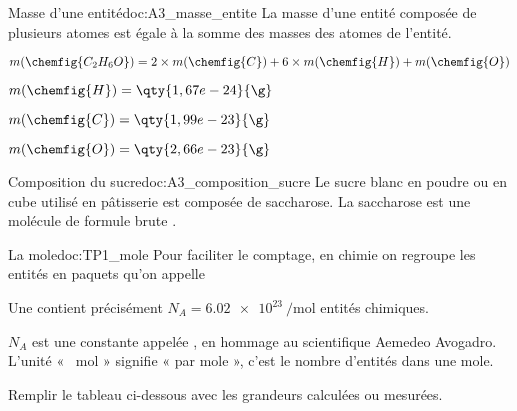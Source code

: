 \begin{doc}{Masse d'une entité}{doc:A3_masse_entite}
  La masse d'une entité composée de plusieurs atomes est égale à la somme des masses des atomes de l'entité.
  
  \exemple 
  $m(\chemfig{C_2 H_6 O}) = 2\times m(\chemfig{C}) + 6\times m(\chemfig{H}) + m(\chemfig{O})$
  
  \begin{donnees}
    \item $m(\chemfig{H})  = \qty{1,67e-24}{\g}$
    \item $m(\chemfig{C})  = \qty{1,99e-23}{\g}$
    \item $m(\chemfig{O})  = \qty{2,66e-23}{\g}$
  \end{donnees}
\end{doc}

\begin{doc}{Composition du sucre}{doc:A3_composition_sucre}
  Le sucre blanc en poudre ou en cube utilisé en pâtisserie est composée de saccharose.
  La saccharose est une molécule de formule brute .
\end{doc}




\begin{doc}{La mole}{doc:TP1_mole}
  Pour faciliter le comptage, en chimie on regroupe les entités en paquets qu'on appelle 
  \begin{importants}
    Une  contient précisément $N_A = \qty{6,02 e23}{\per\mole}$ entités chimiques.
  \end{importants}
  \attention $N_A$ est une constante appelée , en hommage au scientifique Aemedeo Avogadro.
  L'unité « \unit{\per\mole} » signifie « par mole », c’est le nombre d'entités dans une mole.
\end{doc}


\mesure Remplir le tableau ci-dessous avec les grandeurs calculées ou mesurées.

